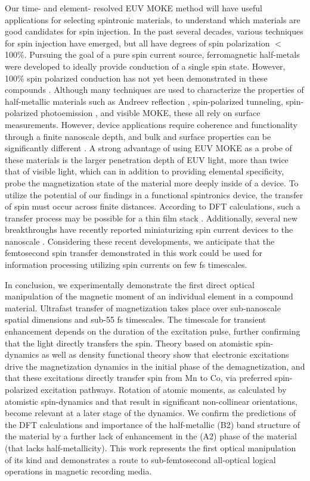 Our time- and element- resolved EUV MOKE method will have useful applications for selecting spintronic materials, to understand which materials are good candidates for spin injection. In the past several decades, various techniques for spin injection have emerged, but all have degrees of spin polarization $<$100\%. Pursuing the goal of a pure spin current source, ferromagnetic half-metals were developed to ideally provide conduction of a single spin state. However, 100\% spin polarized conduction has not yet been demonstrated in these compounds \cite{Dong2005}. Although many techniques are used to characterize the properties of half-metallic materials such as Andreev reflection \cite{Andreev1964,Kupferschmidt2011}, spin-polarized tunneling, spin-polarized photoemission \cite{Sun2013}, and visible MOKE\cite{Muller2009}, these all rely on surface measurements. However, device applications require coherence and functionality through a finite nanoscale depth, and bulk and surface properties can be significantly different \cite{Attema2005,Fisher1967,Pincelli2017}. A strong advantage of using EUV MOKE as a probe of these materials is the larger penetration depth of EUV light, more than twice that of visible light, which can in addition to providing elemental specificity, probe the magnetization state of the material more deeply inside of a device. To utilize the potential of our findings in a functional spintronics device, the transfer of spin must occur across finite distances. According to DFT calculations, such a transfer process may be possible for a thin film stack \cite{Dewhurst2018}. Additionally, several new breakthroughs have recently reported miniaturizing spin current devices to the nanoscale \cite{Kruglyak2010,Wagner2016}. Considering these recent developments, we anticipate that the femtosecond spin transfer demonstrated in this work could be used for information processing utilizing spin currents on few fs timescales. 

In conclusion, we experimentally demonstrate the first direct optical manipulation of the magnetic moment of an individual element in a compound material.  Ultrafast transfer of magnetization takes place over sub-nanoscale spatial dimensions and sub-55 fs timescales. The timescale for transient enhancement depends on the duration of the excitation pulse, further confirming that the light directly transfers the spin. Theory based on atomistic spin-dynamics as well as density functional theory show that electronic excitations drive the magnetization dynamics in the initial phase of the demagnetization, and that these excitations directly transfer spin from Mn to Co, via preferred spin-polarized excitation pathways. Rotation of atomic moments, as calculated by atomistic spin-dynamics and that result in significant non-collinear orientations, become relevant at a later stage of the dynamics. We confirm the predictions of the DFT calculations and importance of the half-metallic (B2) band structure of the material by a further lack of enhancement in the (A2) phase of the material (that lacks half-metallicity). This work represents the first optical manipulation of its kind and demonstrates a route to sub-femtosecond all-optical logical operations in magnetic recording media.